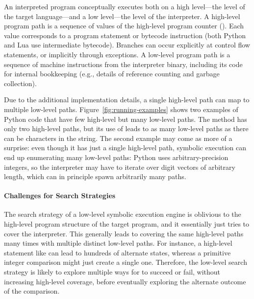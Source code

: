 An interpreted program conceptually executes both on a high level---the level of the target language---and a low level---the level of the interpreter.
%
A high-level program path is a sequence of values of the high-level program counter (\hlpc). Each \hlpc value corresponds to a program statement or bytecode instruction (both Python and Lua use intermediate bytecode).  Branches can occur explicitly at control flow statements, or implicitly through exceptions.
%
A low-level program path is a sequence of machine instructions from the interpreter binary, including its code for internal bookkeeping (e.g., details of reference counting and garbage collection).

Due to the additional implementation details, a single high-level path can map to multiple low-level paths.
%
Figure~\ref{fig:running-examples} shows two examples of Python code that have few high-level but many low-level paths. The  method has only two high-level paths, but its use of  leads to as many low-level paths as there can be characters in the  string.
%
The second example  may come as more of a surprise: even though it has just a single high-level path, symbolic execution can end up enumerating many low-level paths: Python uses arbitrary-precision integers, so the interpreter may have to iterate over digit vectors of arbitrary length, which can in principle spawn arbitrarily many paths.


\paragraph{Challenges for Search Strategies}
%
The search strategy of a low-level symbolic execution engine is oblivious to the high-level program structure of the target program, and it essentially just tries to cover the interpreter. This generally leads to covering the same high-level paths many times with multiple distinct low-level paths.
%
For instance, a high-level statement like  can lead to hundreds of alternate states, whereas a primitive integer comparison might just create a single one. Therefore, the low-level search strategy is likely to explore multiple ways for  to succeed or fail, without increasing high-level coverage, before eventually exploring the alternate outcome of the comparison.


